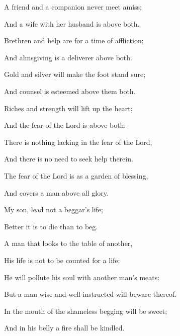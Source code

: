 {\par }{\Q {}A friend and a companion never meet amiss;
\par }{\Q And a wife with her husband is above both.
\par }{\Q {}Brethren and help are for a time of affliction;
\par }{\Q And almsgiving is a deliverer above both.
\par }{\Q {}Gold and silver will make the foot stand sure;
\par }{\Q And counsel is esteemed above them both.
\par }{\Q {}Riches and strength will lift up the heart;
\par }{\Q And the fear of the Lord is above both:
\par }{\Q There is nothing lacking in the fear of the Lord,
\par }{\Q And there is no need to seek help therein.
\par }{\Q {}The fear of the Lord is as a garden of blessing,
\par }{\Q And covers
 a man above all glory.
\par }{\BB \par }{\Q {}My son, lead not a beggar’s life;
\par }{\Q Better it is to die than to beg.
\par }{\Q {}A man that looks to the table of another,
\par }{\Q His life is not to be counted for a life;
\par }{\Q He will pollute his soul with another man’s meats:
\par }{\Q But a man wise and well-instructed will beware thereof.
\par }{\Q {}In the mouth of the shameless begging will be sweet;
\par }{\Q And in his belly a fire shall be kindled.
\par }{\BB \par }
